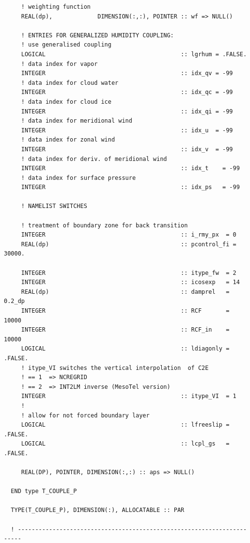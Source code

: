 \documentclass[11pt,twoside]{article}
\begin{document}
\begin{verbatim}
     ! weighting function
     REAL(dp),             DIMENSION(:,:), POINTER :: wf => NULL()

     ! ENTRIES FOR GENERALIZED HUMIDITY COUPLING:
     ! use generalised coupling
     LOGICAL                                       :: lgrhum = .FALSE.
     ! data index for vapor
     INTEGER                                       :: idx_qv = -99
     ! data index for cloud water
     INTEGER                                       :: idx_qc = -99
     ! data index for cloud ice
     INTEGER                                       :: idx_qi = -99
     ! data index for meridional wind
     INTEGER                                       :: idx_u  = -99
     ! data index for zonal wind
     INTEGER                                       :: idx_v  = -99
     ! data index for deriv. of meridional wind
     INTEGER                                       :: idx_t    = -99
     ! data index for surface pressure
     INTEGER                                       :: idx_ps   = -99
     
     ! NAMELIST SWITCHES

     ! treatment of boundary zone for back transition
     INTEGER                                       :: i_rmy_px  = 0 
     REAL(dp)                                      :: pcontrol_fi = 30000.

     INTEGER                                       :: itype_fw  = 2 
     INTEGER                                       :: icosexp   = 14
     REAL(dp)                                      :: damprel   = 0.2_dp
     INTEGER                                       :: RCF       = 10000
     INTEGER                                       :: RCF_in    = 10000
     LOGICAL                                       :: ldiagonly = .FALSE.
     ! itype_VI switches the vertical interpolation  of C2E
     ! == 1  => NCREGRID
     ! == 2  => INT2LM inverse (MesoTel version)
     INTEGER                                       :: itype_VI  = 1
     !
     ! allow for not forced boundary layer
     LOGICAL                                       :: lfreeslip = .FALSE.
     LOGICAL                                       :: lcpl_gs   = .FALSE.

     REAL(DP), POINTER, DIMENSION(:,:) :: aps => NULL()

  END type T_COUPLE_P

  TYPE(T_COUPLE_P), DIMENSION(:), ALLOCATABLE :: PAR

  ! -----------------------------------------------------------------------
\end{verbatim}
\end{document}
